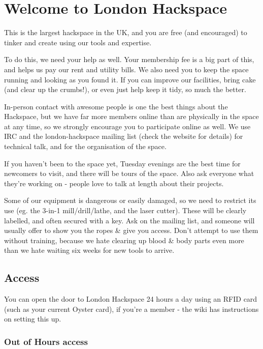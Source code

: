 \documentclass[11pt,a5paper,twoside]{memoir}
\begin{document}

\chapter{Welcome to London Hackspace}

This is the largest hackspace in the UK, and you are free (and encouraged) to tinker and create using our tools and expertise.

To do this, we need your help as well. Your membership fee is a big part of this, and helps us pay our rent and utility bills. We also need you to keep the space running and looking as you found it. If you can improve our facilities, bring cake (and clear up the crumbs!), or even just help keep it tidy, so much the better.

In-person contact with awesome people is one the best things about the Hackspace, but we have far more members online than are physically in the space at any time, so we strongly encourage you to participate online as well. We use IRC and the london-hackspace mailing list (check the website for details) for technical talk, and for the organisation of the space.

If you haven't been to the space yet, Tuesday evenings are the best time for newcomers to visit, and there will be tours of the space. Also ask everyone what they're working on - people love to talk at length about their projects.

Some of our equipment is dangerous or easily damaged, so we need to restrict its use (eg. the 3-in-1 mill/drill/lathe, and the laser cutter). These will be clearly labelled, and often secured with a key. Ask on the mailing list, and someone will usually offer to show you the ropes \& give you access. Don't attempt to use them without training, because we hate clearing up blood \& body parts even more than we hate waiting six weeks for new tools to arrive.

\section{Access}

You can open the door to London Hackspace 24 hours a day using an RFID card (such as your current Oyster card), if you're a member - the wiki has instructions on setting this up.

\subsection{Out of Hours access}
\end{document}
